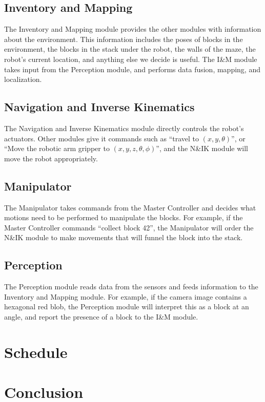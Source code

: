 \documentclass[letterpaper,11pt]{article}
\begin{document}
\subsection{Inventory and Mapping}
The Inventory and Mapping module provides the other modules with information about the environment.
This information includes the poses of blocks in the environment,
the blocks in the stack under the robot,
the walls of the maze,
the robot's current location,
and anything else we decide is useful.
The I\&M module takes input from the Perception module, and performs data fusion, mapping, and localization.

\subsection{Navigation and Inverse Kinematics}
The Navigation and Inverse Kinematics module directly controls the robot's actuators.
Other modules give it commands such as ``travel to $(x, y, \theta)$'',
or ``Move the robotic arm gripper to $(x, y, z, \theta, \phi)$'',
and the N\&IK module will move the robot appropriately.

\subsection{Manipulator}
The Manipulator takes commands from the Master Controller
and decides what motions need to be performed to manipulate the blocks.
For example, if the Master Controller commands ``collect block 42'',
the Manipulator will order the N\&IK module to make movements that will funnel the block into the stack.

\subsection{Perception}
The Perception module reads data from the sensors and feeds information to the Inventory and Mapping module.
For example, if the camera image contains a hexagonal red blob,
the Perception module will interpret this as a block at an angle,
and report the presence of a block to the I\&M module.

\section{Schedule}

\section{Conclusion}
\end{document}
